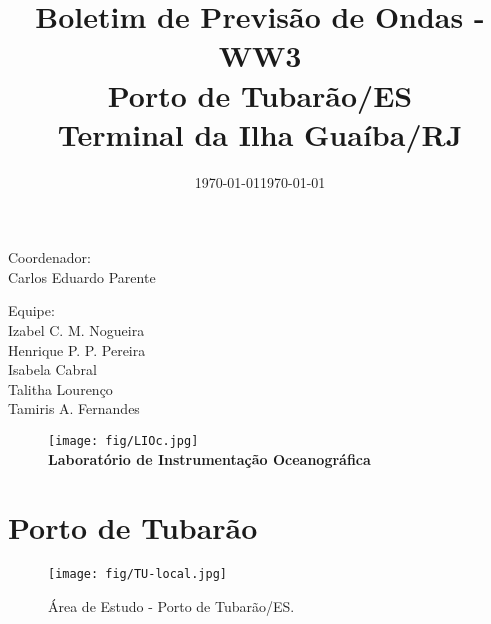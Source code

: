 \documentclass{article}
\title{\textbf{Boletim de Previsão de Ondas - WW3} \\
\vspace{1cm}
Porto de Tubarão/ES  \\ Terminal da Ilha Guaíba/RJ} %
\date{\today} %
\date{\today} %
\begin{document}
\maketitle %

{\large
\begin{center}
Coordenador: \\
\vspace{0.2cm}
Carlos Eduardo Parente \\
\end{center}

\vspace{0.3cm}

\begin{center}
Equipe: \\
\vspace{0.2cm}
Izabel C. M. Nogueira \\ 
Henrique P. P. Pereira \\
Isabela Cabral \\
Talitha Lourenço \\
Tamiris A. Fernandes 
\end{center}
}

\vspace{2cm}

\begin{figure}[H]
\begin{center}
\texttt{[image: fig/LIOc.jpg]} \\ %
\vspace{0.5cm}
\textbf{Laboratório de Instrumentação Oceanográfica}
\end{center}
\end{figure}

\pagebreak


\section{Porto de Tubarão}


\begin{figure}[H]
\begin{center}
\texttt{[image: fig/TU-local.jpg]} %
\caption{Área de Estudo - Porto de Tubarão/ES.}
\end{center}
\end{figure}
\end{document}
